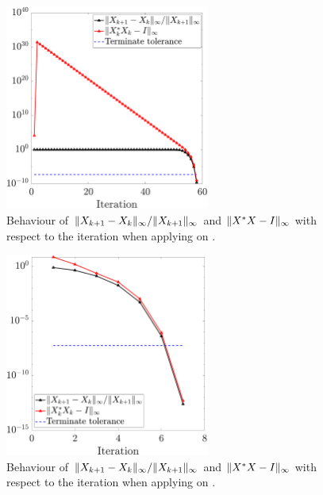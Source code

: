 \documentclass[12pt]{article}
\begin{document}
\begin{figure}[H]
    \centering
    \includegraphics[width=0.6\textwidth]{../code/magic6.pdf}
    \caption{Behaviour of $\|{X_{k+1} - X_{k}}\|_\infty/\|{X_{k+1}}\|_\infty$ and $\|{X^* X - I}\|_\infty$ with respect to the iteration when applying  on .}
\end{figure}

\begin{figure}[H]
    \centering
    \includegraphics[width=0.6\textwidth]{../code/hadamard8.pdf}
    \caption{Behaviour of $\|{X_{k+1} - X_{k}}\|_\infty/\|{X_{k+1}}\|_\infty$ and $\|{X^* X - I}\|_\infty$ with respect to the iteration when applying  on .}
\end{figure}
\end{document}
